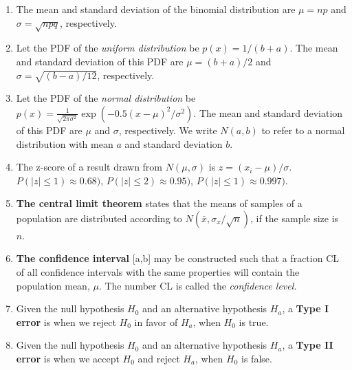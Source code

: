 \documentclass{article}
\begin{document}
\begin{enumerate}
\item The mean and standard deviation of the binomial distribution are $\mu = np$ and $\sigma = \sqrt{npq}$, respectively.
\item Let the PDF of the \textit{uniform distribution} be $p(x) = 1/(b+a)$.  The mean and standard deviation of this PDF are $\mu = (b+a)/2$ and $\sigma = \sqrt{(b-a)/12}$, respectively.
\item Let the PDF of the \textit{normal distribution} be $p(x) = \frac{1}{\sqrt{2\pi\sigma^2}} \exp(-0.5 (x-\mu)^2/\sigma^2)$.  The mean and standard deviation of this PDF are $\mu$ and $\sigma$, respectively.  We write $N(a,b)$ to refer to a normal distribution with mean $a$ and standard deviation $b$.
\item The z-score of a result drawn from $N(\mu,\sigma)$ is $z = (x_i - \mu)/\sigma$.  $P(|z| \leq 1) \approx 0.68)$, $P(|z| \leq 2) \approx 0.95)$, $P(|z| \leq 1) \approx 0.997)$.
\item \textbf{The central limit theorem} states that the means of samples of a population are distributed according to $N(\bar{x},\sigma_x/\sqrt{n})$, if the sample size is $n$.
\item \textbf{The confidence interval} [a,b] may be constructed such that a fraction CL of all confidence intervals with the same properties will contain the population mean, $\mu$.  The number CL is called the \textit{confidence level.}
\item Given the null hypothesis $H_0$ and an alternative hypothesis $H_a$, a \textbf{Type I error} is when we reject $H_0$ in favor of $H_a$, when $H_0$ is true.
\item Given the null hypothesis $H_0$ and an alternative hypothesis $H_a$, a \textbf{Type II error} is when we accept $H_0$ and reject $H_a$, when $H_0$ is false. 
\end{enumerate}

\clearpage
\end{document}
